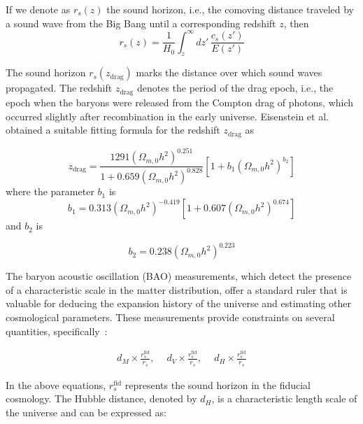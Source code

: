\documentclass[universe,article,accept,moreauthors,pdftex]{Definitions/mdpi}
\begin{document}
If we denote as $r_{s}(z)$ the sound horizon, i.e., the comoving distance traveled by a sound wave from the Big Bang until a corresponding redshift $z$, then \cite{dodelson2020modern,amendola_tsujikawa_2010}
\begin{equation}\label{sound}
r_{s}(z)=\frac{1}{H_{0}}\int_{z}^{\infty} dz' \,\frac{c_{s}(z')}{E(z')}\end{equation} 

The sound horizon $r_{s}(z_{\text{drag}})$  marks the distance over which sound waves propagated. The redshift $z_{\text{drag}}$ denotes the period of the drag epoch, i.e., the epoch when the baryons were released from the Compton drag of photons, which occurred slightly after recombination in the early universe. Eisenstein et al. \cite{Eisenstein:1997ik} obtained a suitable fitting formula for the redshift $z_{\text{drag}}$ as 

\begin{equation}
    z_{\text{drag}}=\frac{1291 (\Omega_{m,0}h^{2})^{0.251}}{1+0.659(\Omega_{m,0}h^{2})^{0.828}}[1+b_{1}(\Omega_{m,0}h^{2})^{b_{2}}]
\end{equation}
where the parameter $b_{1}$ is 
\begin{equation}b_{1}=0.313(\Omega_{m,0}h^{2})^{-0.419} [1+0.607 (\Omega_{m,0}h^{2})^{0.674}]\end{equation}
and  $b_{2}$ is

\begin{equation}b_{2}=0.238 (\Omega_{m,0}h^{2})^{0.223}\end{equation}
 
 

 
 
 
The baryon acoustic oscillation (BAO) measurements, which detect the presence of a characteristic scale in the matter distribution, offer a standard ruler that is valuable for deducing the expansion history of the universe and estimating other cosmological parameters. These measurements provide constraints on several quantities, \mbox{specifically \cite{Kazantzidis_2019}:}

\begin{align}
d_{M}\times \frac{r_{s}^{\text{fid}}}{r_{s}},\quad \ d_{V}\times \frac{r_{s}^{\text{fid}}}{r_{s}},\quad \ d_{H}\times \frac{r_{s}^{\text{fid}}}{r_{s}}
\end{align}

In the above equations, $r_{s}^{\text{fid}}$ represents the sound horizon in the fiducial cosmology. The Hubble distance, denoted by $d_{H}$, is a characteristic length scale of the universe and can be expressed as:
\end{document}
